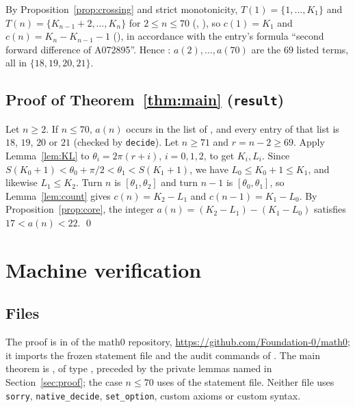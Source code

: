 \documentclass[11pt]{amsart}
\theoremstyle{plain}
\theoremstyle{definition}
\begin{document}
By Proposition~\ref{prop:crossing} and strict monotonicity, $T(1)=\{1,\dots,K_1\}$ and $T(n)=\{K_{n-1}+2,\dots,K_n\}$ for $2\le n\le70$ (, ), so $c(1)=K_1$ and $c(n)=K_n-K_{n-1}-1$ (), in accordance with the entry's formula ``second forward difference of A072895''. Hence : $a(2),\dots,a(70)$ are the $69$ listed terms, all in $\{18,19,20,21\}$.

\subsection{Proof of Theorem~\ref{thm:main} (\texorpdfstring{\texttt{result}}{result})}
Let $n\ge2$. If $n\le70$, $a(n)$ occurs in the list of , and every entry of that list is $18$, $19$, $20$ or $21$ (checked by \texttt{decide}).
Let $n\ge71$ and $r=n-2\ge69$. Apply Lemma~\ref{lem:KL} to $\theta_i=2\pi(r+i)$, $i=0,1,2$, to get $K_i,L_i$.
Since $S(K_0+1)<\theta_0+\pi/2<\theta_1<S(K_1+1)$, we have $L_0\le K_0+1\le K_1$, and likewise $L_1\le K_2$.
Turn $n$ is $[\theta_1,\theta_2]$ and turn $n-1$ is $[\theta_0,\theta_1]$, so Lemma~\ref{lem:count} gives $c(n)=K_2-L_1$ and $c(n-1)=K_1-L_0$.
By Proposition~\ref{prop:core}, the integer $a(n)=(K_2-L_1)-(K_1-L_0)$ satisfies $17<a(n)<22$. \qed

\section{Machine verification}\label{sec:lean}

\subsection*{Files}
The proof is in  of the math0 repository, \url{https://github.com/Foundation-0/math0}; it imports the frozen statement file and the audit commands of .
The main theorem is , of type , preceded by the private lemmas named in Section~\ref{sec:proof}; the case $n\le70$ uses  of the statement file.
Neither file uses \texttt{sorry}, \texttt{native\_decide}, \texttt{set\_option}, custom axioms or custom syntax.
\end{document}
